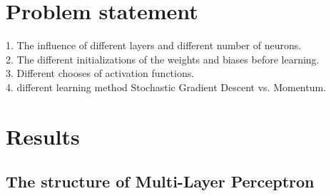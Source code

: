 \documentclass[12pt,a4paper]{article}
\begin{document}
\section{Problem statement}
1. The influence of different layers and different number of neurons.\\
2. The different initializations of the weights and biases before learning.\\
3. Different chooses of activation functions.\\
4. different learning method Stochastic Gradient Descent vs. Momentum.\\
\section{Results}
\subsection{The structure of Multi-Layer Perceptron}
\end{document}
